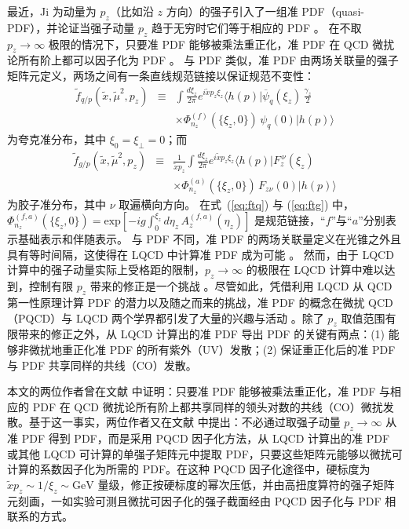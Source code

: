 最近，Ji 为动量为 $p_z$（比如沿 $z$ 方向）的强子引入了一组准 PDF（quasi-PDF），并论证当强子动量 $p_z$ 趋于无穷时它们等于相应的 PDF \cite{Ji:2013dva}。
在不取 $p_z\to\infty$ 极限的情况下，只要准 PDF 能够被乘法重正化，准 PDF 在 QCD 微扰论所有阶上都可以因子化为 PDF \cite{Ma:2014jla}。
与 PDF 类似，准 PDF 由两场关联量的强子矩阵元定义，两场之间有一条直线规范链接以保证规范不变性：
\begin{eqnarray}
\label{eq:ftq}
\tilde{f}_{q/p}(\tilde{x},\tilde{\mu}^2,p_z)
&\equiv &
\int \frac{d\xi_z}{2\pi} e^{i \tilde{x}p_z \xi_z}\langle h(p)| \overline{\psi}_q(\xi_z)\,\frac{\gamma_z}{2}
\nonumber\\
&\ & \times
\Phi_{n_z}^{(f)}(\{\xi_z,0\})\, \psi_q(0) | h(p) \rangle
\end{eqnarray}
为夸克准分布，其中 $\xi_0=\xi_\perp=0$；而
\begin{eqnarray}
\label{eq:ftg}
\tilde{f}_{g/p}(\tilde{x},\tilde{\mu}^2,p_z)
&\equiv &
\frac{1}{\tilde{x}p_z}
\int \frac{d\xi_z}{2\pi} e^{i \tilde{x} p_z \xi_z}\langle h(p)| F_{z}^{\ \nu}(\xi_z)\,
\nonumber\\
&\ & \times
\Phi_{n_z}^{(a)}(\{\xi_z,0\})\, F_{z\nu}(0) | h(p) \rangle
\end{eqnarray}
为胶子准分布，其中 $\nu$ 取遍横向方向。
在式~(\ref{eq:ftq}) 与 (\ref{eq:ftg}) 中，$\Phi_{n_z}^{(f,a)}(\{\xi_z,0\}) = \text{exp}[-ig\int_0^{\xi_z} d\eta_z\, A^{(f,a)}_z(\eta_z)]$ 是规范链接，``$f$''与``$a$''分别表示基础表示和伴随表示。
与 PDF 不同，准 PDF 的两场关联量定义在光锥之外且具有等时间隔，这使得在 LQCD 中计算准 PDF 成为可能 \cite{Lin:2014zya,Alexandrou:2015rja,Chen:2016utp,Zhang:2017bzy,Orginos:2017kos}。
然而，由于 LQCD 计算中的强子动量实际上受格距的限制，$p_z\to\infty$ 的极限在 LQCD 计算中难以达到，控制有限 $p_z$ 带来的修正是一个挑战 \cite{Ji:2014gla,Ji:2017rah}。尽管如此，凭借利用 LQCD 从 QCD 第一性原理计算 PDF 的潜力以及随之而来的挑战，准 PDF 的概念在微扰 QCD（PQCD）与 LQCD 两个学界都引发了大量的兴趣与活动 \cite{Ji:2014hxa,Gamberg:2014zwa,Jia:2015pxx,Li:2016amo,Bacchetta:2016zjm,Radyushkin:2016hsy,Radyushkin:2017gjd,Gbedo:2017eyp,Radyushkin:2017ffo,Carlson:2017gpk,Briceno:2017cpo,Nam:2017gzm,Xiong:2017jtn,Radyushkin:2017cyf,Constantinou:2017sej,Yoon:2017qzo,Rossi:2017muf}。除了 $p_z$ 取值范围有限带来的修正之外，从 LQCD 计算出的准 PDF 导出 PDF 的关键有两点：(1) 能够非微扰地重正化准 PDF 的所有紫外（UV）发散；(2) 保证重正化后的准 PDF 与 PDF 共享同样的共线（CO）发散。

本文的两位作者曾在文献 \cite{Ma:2014jla} 中证明：只要准 PDF 能够被乘法重正化，准 PDF 与相应的 PDF 在 QCD 微扰论所有阶上都共享同样的领头对数的共线（CO）微扰发散。基于这一事实，两位作者又在文献 \cite{Ma:2014jla} 中提出：不必通过取强子动量 $p_z\to\infty$ 从准 PDF 得到 PDF，而是采用 PQCD 因子化方法，从 LQCD 计算出的准 PDF 或其他 LQCD 可计算的单强子矩阵元中提取 PDF，只要这些矩阵元能够以微扰可计算的系数因子化为所需的 PDF。在这种 PQCD 因子化途径中，硬标度为 $\tilde{x}p_z \sim 1/\xi_z \sim \text{GeV}$ 量级，修正按硬标度的幂次压低，并由高扭度算符的强子矩阵元刻画，一如实验可测且微扰可因子化的强子截面经由 PQCD 因子化与 PDF 相联系的方式。


